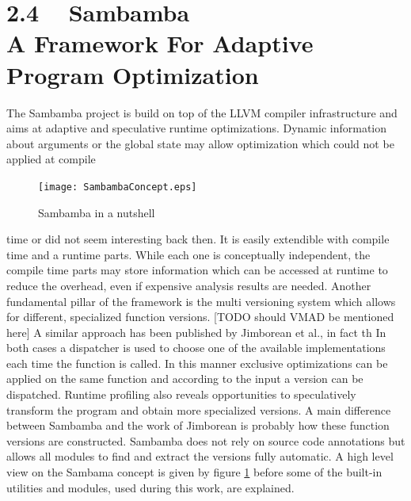 \section*{2.4 ~ Sambamba \\ A Framework For Adaptive Program Optimization}
The Sambamba project is build on top of the LLVM compiler infrastructure and 
aims at adaptive and speculative runtime optimizations.
Dynamic information about arguments or the global state may allow optimization
which could not be applied at compile 
\begin{figure}
  \centering
  \texttt{[image: SambambaConcept.eps]}
  \caption{Sambamba in a nutshell}
  \label{fig:SambambaConcept}  
\end{figure}
time or did not seem interesting back then. It is easily extendible with 
compile time and a runtime parts. While each one is conceptually 
independent, the compile time parts may store information which can be accessed
at runtime to reduce the overhead, even if expensive analysis results are needed. 
Another fundamental pillar of the framework is the multi versioning system which
allows for different, specialized function versions. [TODO should VMAD be mentioned here]
A similar approach has
been published by Jimborean et al.\cite{JIMBOREAN-2012-664345}, in fact th
In both cases a dispatcher is used to choose one of the available 
implementations each time the function is called. 
In this manner exclusive optimizations can be applied on the same function and
according to the input a version can be dispatched. Runtime profiling also 
reveals opportunities to speculatively transform the program and obtain more
specialized versions. A main difference between Sambamba and the work of 
Jimborean is probably how these function versions are constructed. Sambamba does
not rely on source code annotations but allows all modules to find and extract
the versions fully automatic. A high level view on the Sambama concept is given
by figure \ref{fig:SambambaConcept} before some of the  built-in utilities 
and modules, used during this work, are explained. 


\clearpage
